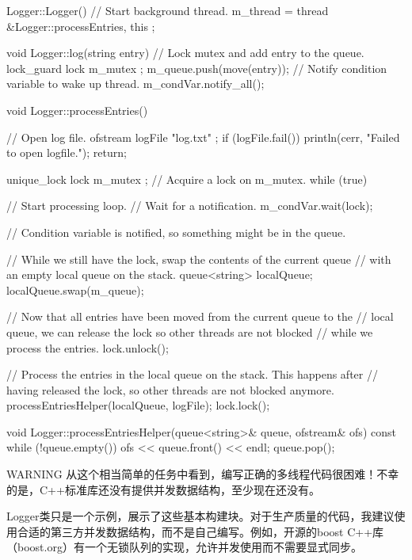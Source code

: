 \begin{cpp}
Logger::Logger()
{
    // Start background thread.
    m_thread = thread { &Logger::processEntries, this };
}

void Logger::log(string entry)
{
    // Lock mutex and add entry to the queue.
    lock_guard lock { m_mutex };
    m_queue.push(move(entry));
    // Notify condition variable to wake up thread.
    m_condVar.notify_all();
}

void Logger::processEntries()
{
    // Open log file.
    ofstream logFile { "log.txt" };
    if (logFile.fail()) {
        println(cerr, "Failed to open logfile.");
        return;
    }

    unique_lock lock { m_mutex }; // Acquire a lock on m_mutex.
    while (true) { // Start processing loop.
        // Wait for a notification.
        m_condVar.wait(lock);

        // Condition variable is notified, so something might be in the queue.

        // While we still have the lock, swap the contents of the current queue
        // with an empty local queue on the stack.
        queue<string> localQueue;
        localQueue.swap(m_queue);

        // Now that all entries have been moved from the current queue to the
        // local queue, we can release the lock so other threads are not blocked
        // while we process the entries.
        lock.unlock();

        // Process the entries in the local queue on the stack. This happens after
        // having released the lock, so other threads are not blocked anymore.
        processEntriesHelper(localQueue, logFile);
        lock.lock();
    }
}

void Logger::processEntriesHelper(queue<string>& queue, ofstream& ofs) const
{
    while (!queue.empty()) {
        ofs << queue.front() << endl;
        queue.pop();
    }
}
\end{cpp}

\begin{myWarning}{WARNING}
从这个相当简单的任务中看到，编写正确的多线程代码很困难！不幸的是，C++标准库还没有提供并发数据结构，至少现在还没有。

Logger类只是一个示例，展示了这些基本构建块。对于生产质量的代码，我建议使用合适的第三方并发数据结构，而不是自己编写。例如，开源的boost C++库（boost.org）有一个无锁队列的实现，允许并发使用而不需要显式同步。
\end{myWarning}

